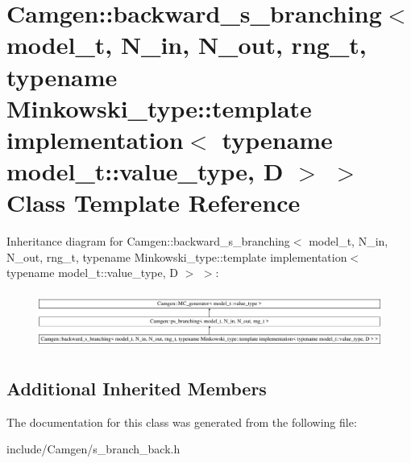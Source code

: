 \hypertarget{a00021}{\section{Camgen\-:\-:backward\-\_\-s\-\_\-branching$<$ model\-\_\-t, N\-\_\-in, N\-\_\-out, rng\-\_\-t, typename Minkowski\-\_\-type\-:\-:template implementation$<$ typename model\-\_\-t\-:\-:value\-\_\-type, D $>$ $>$ Class Template Reference}
\label{a00021}
}
Inheritance diagram for Camgen\-:\-:backward\-\_\-s\-\_\-branching$<$ model\-\_\-t, N\-\_\-in, N\-\_\-out, rng\-\_\-t, typename Minkowski\-\_\-type\-:\-:template implementation$<$ typename model\-\_\-t\-:\-:value\-\_\-type, D $>$ $>$\-:\begin{figure}[H]
\begin{center}
\leavevmode
\includegraphics[height=1.879195cm]{a00021}
\end{center}
\end{figure}
\subsection*{Additional Inherited Members}


The documentation for this class was generated from the following file\-:\begin{DoxyCompactItemize}
\item 
include/\-Camgen/s\-\_\-branch\-\_\-back.\-h\end{DoxyCompactItemize}
